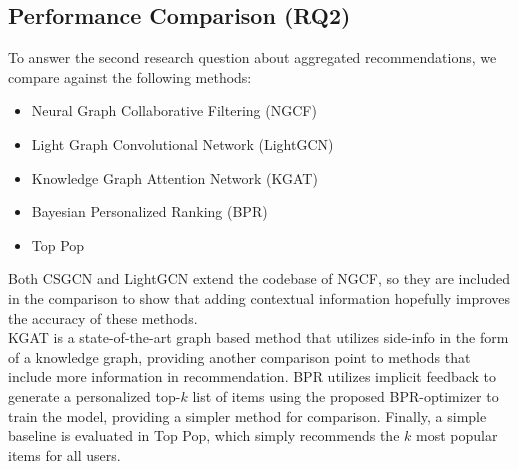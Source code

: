 \subsection{Performance Comparison (RQ2)}
To answer the second research question about aggregated recommendations, we compare against the following methods:
\begin{itemize}
    \item Neural Graph Collaborative Filtering (NGCF) \cite{NGCF}
    \item Light Graph Convolutional Network (LightGCN) \cite{LightGCN}
    \item Knowledge Graph Attention Network (KGAT) \cite{KGAT}
    \item Bayesian Personalized Ranking (BPR) \cite{BPR}
    \item Top Pop
\end{itemize}
Both CSGCN and LightGCN extend the codebase of NGCF, so they are included in the comparison to show that adding contextual information hopefully improves the accuracy of these methods.\\
KGAT is a state-of-the-art graph based method that utilizes side-info in the form of a knowledge graph, providing another comparison point to methods that include more information in recommendation.
BPR utilizes implicit feedback to generate a personalized top-$k$ list of items using the proposed BPR-optimizer to train the model, providing a simpler method for comparison.
Finally, a simple baseline is evaluated in Top Pop, which simply recommends the $k$ most popular items for all users.
